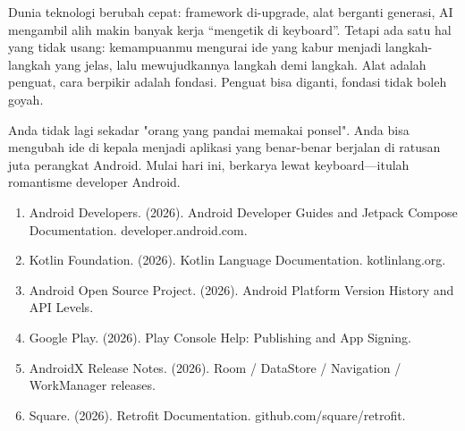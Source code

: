 Dunia teknologi berubah cepat: framework di-upgrade, alat berganti generasi, AI mengambil alih makin banyak kerja “mengetik di keyboard”. Tetapi ada satu hal yang tidak usang: kemampuanmu mengurai ide yang kabur menjadi langkah-langkah yang jelas, lalu mewujudkannya langkah demi langkah. Alat adalah penguat, cara berpikir adalah fondasi. Penguat bisa diganti, fondasi tidak boleh goyah.

Anda tidak lagi sekadar "orang yang pandai memakai ponsel". Anda bisa mengubah ide di kepala menjadi aplikasi yang benar-benar berjalan di ratusan juta perangkat Android. Mulai hari ini, berkarya lewat keyboard—itulah romantisme developer Android.


\begin{enumerate}
  \item Android Developers. (2026). Android Developer Guides and Jetpack Compose Documentation. developer.android.com.
  \item Kotlin Foundation. (2026). Kotlin Language Documentation. kotlinlang.org.
  \item Android Open Source Project. (2026). Android Platform Version History and API Levels.
  \item Google Play. (2026). Play Console Help: Publishing and App Signing.
  \item AndroidX Release Notes. (2026). Room / DataStore / Navigation / WorkManager releases.
  \item Square. (2026). Retrofit Documentation. github.com/square/retrofit.
\end{enumerate}
